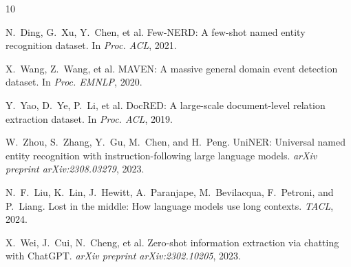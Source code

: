 \documentclass[11pt,a4paper]{article}
\begin{document}

\begin{thebibliography}{10}

N.~Ding, G.~Xu, Y.~Chen, et al.
\newblock Few-NERD: A few-shot named entity recognition dataset.
\newblock In \emph{Proc. ACL}, 2021.

X.~Wang, Z.~Wang, et al.
\newblock MAVEN: A massive general domain event detection dataset.
\newblock In \emph{Proc. EMNLP}, 2020.

Y.~Yao, D.~Ye, P.~Li, et al.
\newblock DocRED: A large-scale document-level relation extraction dataset.
\newblock In \emph{Proc. ACL}, 2019.

W.~Zhou, S.~Zhang, Y.~Gu, M.~Chen, and H.~Peng.
\newblock UniNER: Universal named entity recognition with instruction-following large language models.
\newblock \emph{arXiv preprint arXiv:2308.03279}, 2023.

N.~F.~Liu, K.~Lin, J.~Hewitt, A.~Paranjape, M.~Bevilacqua, F.~Petroni, and P.~Liang.
\newblock Lost in the middle: How language models use long contexts.
\newblock \emph{TACL}, 2024.

X.~Wei, J.~Cui, N.~Cheng, et al.
\newblock Zero-shot information extraction via chatting with ChatGPT.
\newblock \emph{arXiv preprint arXiv:2302.10205}, 2023.

\end{thebibliography}
\end{document}
